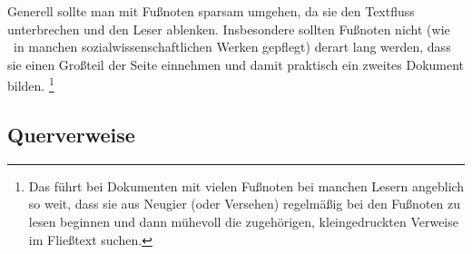 Generell sollte man mit Fußnoten sparsam umgehen, da sie den
Textfluss unterbrechen und den Leser ablenken. Insbesondere
sollten Fußnoten nicht (wie \va\ in manchen
sozialwissenschaftlichen Werken gepflegt) derart lang werden, dass
sie einen Großteil der Seite einnehmen und damit praktisch ein
zweites Dokument bilden.%
\footnote{Das führt bei Dokumenten mit vielen Fußnoten bei manchen Lesern angeblich so weit, dass sie aus Neugier (oder Versehen) regelmäßig bei den Fußnoten zu lesen beginnen und dann mühevoll die zugehörigen, kleingedruckten Verweise im Fließtext suchen.}


\subsection{Querverweise}
\label{sec:querverweise}


